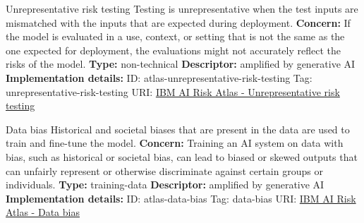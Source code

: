 \documentclass[a4paper,12pt]{article}
\begin{document}
\begin{definitionbox}{Unrepresentative risk testing}
Testing is unrepresentative when the test inputs are mismatched with the inputs that are expected during deployment.\newline\newline
\textbf{Concern: }If the model is evaluated in a use, context, or setting that is not the same as the one expected for deployment, the evaluations might not accurately reflect the risks of the model.\newline\newline
\textbf{Type: }non-technical\newline
\textbf{Descriptor: }amplified by generative AI \newline\newline
\textbf{Implementation details: } \newline
ID: atlas-unrepresentative-risk-testing \newline
Tag: unrepresentative-risk-testing \newline
URI:  \href{https://www.ibm.com/docs/en/watsonx/saas?topic=SSYOK8/wsj/ai-risk-atlas/unrepresentative-risk-testing.html}{IBM AI Risk Atlas - Unrepresentative risk testing}\newline
\end{definitionbox}
\begin{definitionbox}{Data bias}
Historical and societal biases that are present in the data are used to train and fine-tune the model.\newline\newline
\textbf{Concern: }Training an AI system on data with bias, such as historical or societal bias, can lead to biased or skewed outputs that can unfairly represent or otherwise discriminate against certain groups or individuals.\newline\newline
\textbf{Type: }training-data\newline
\textbf{Descriptor: }amplified by generative AI \newline\newline
\textbf{Implementation details: } \newline
ID: atlas-data-bias \newline
Tag: data-bias \newline
URI:  \href{https://www.ibm.com/docs/en/watsonx/saas?topic=SSYOK8/wsj/ai-risk-atlas/data-bias.html}{IBM AI Risk Atlas - Data bias}\newline
\end{definitionbox}
\end{document}

